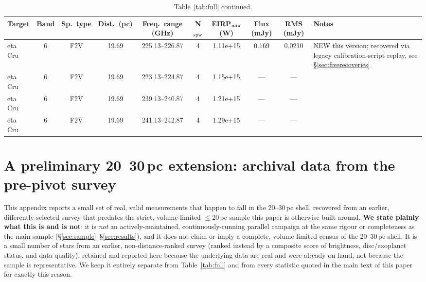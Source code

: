 \documentclass{openjournal}
\begin{document}
\begin{table}
\centering
\scriptsize
\caption{Table~\ref{tab:full} continued.}
\label{tab:full8}
\begin{tabularx}{\textwidth}{@{}l c c c c c c c c X@{}}
\hline
Target & Band & Sp.\ type & Dist.\ (pc) & Freq.\ range (GHz) & N$_{\rm spw}$ & EIRP$_{\rm min}$ (W) & Flux (mJy) & RMS (mJy) & Notes \\
\hline
eta Cru & 6 & F2V & 19.69 & 225.13--226.87 & 4 & 1.11e+15 & 0.169 & 0.0210 & NEW this version; recovered via legacy calibration-script replay, see \S\ref{sec:fiverecoveries} \\
eta Cru & 6 & F2V & 19.69 & 223.13--224.87 & 4 & 1.15e+15 & --- & --- &  \\
eta Cru & 6 & F2V & 19.69 & 239.13--240.87 & 4 & 1.21e+15 & --- & --- &  \\
eta Cru & 6 & F2V & 19.69 & 241.13--242.87 & 4 & 1.29e+15 & --- & --- &  \\
\hline
\end{tabularx}
\end{table}

\section{A preliminary 20--30\,pc extension: archival data from the pre-pivot survey}
\label{app:2030pc}

This appendix reports a small set of real, valid measurements that
happen to fall in the 20--30\,pc shell, recovered from an earlier,
differently-selected survey that predates the strict, volume-limited
$\leq$20\,pc sample this paper is otherwise built around. \textbf{We
state plainly what this is and is not}: it is \emph{not} an
actively-maintained, continuously-running parallel campaign at the same
rigour or completeness as the main sample (\S\ref{sec:sample}--\S\ref{sec:results}),
and it does not claim or imply a complete, volume-limited census of the
20--30\,pc shell. It is a small number of stars from an earlier,
non-distance-ranked survey (ranked instead by a composite score of
brightness, disc/exoplanet status, and data quality), retained and
reported here because the underlying data are real and were already on
hand, not because the sample is representative. We keep it entirely
separate from Table~\ref{tab:full} and from every statistic quoted in
the main text of this paper for exactly this reason.
\end{document}
